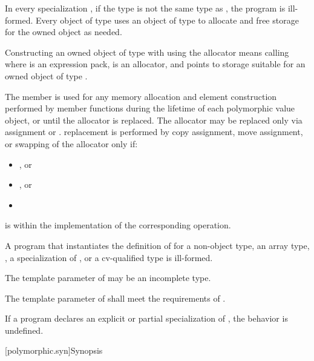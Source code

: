 \pnum
In every specialization ,
if the type 
is not the same type as , the program is ill-formed.
Every object of type 
uses an object of type  to
allocate and free storage for the owned object as needed.

\pnum
Constructing an owned object of type  with 
using the allocator  means calling
 where
 is an expression pack,
 is an allocator, and
 points to storage suitable for an owned object of type .

\pnum
The member  is used for
any memory allocation and element construction
performed by member functions
during the lifetime of each polymorphic value object, or
until the allocator is replaced.
The allocator may be replaced only via
assignment or .
 replacement is performed by
copy assignment,
move assignment, or
swapping of the allocator
only if:
\begin{itemize}
\item
{}, or
\item
{}, or
\item
{}
\end{itemize}
is  within the implementation of
the corresponding  operation.

\pnum
A program that instantiates the definition of  for
a non-object type,
an array type,
,
a specialization of , or
a cv-qualified type
is ill-formed.

\pnum
The template parameter  of 
may be an incomplete type.

\pnum
The template parameter  of 
shall meet the requirements of .

\pnum
If a program declares an explicit or
partial specialization of ,
the behavior is undefined.

[polymorphic.syn]{Synopsis}

